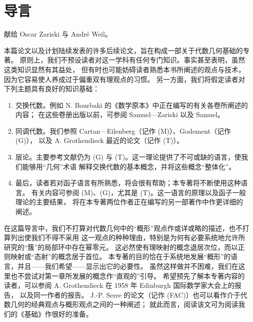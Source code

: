 \chapter*{导言}
\begin{flushright}
献给 Oscar Zariski 与 André Weil。
\end{flushright}

本篇论文以及计划陆续发表的许多后续论文，旨在构成一部关于代数几何基础的专著。
原则上，我们不预设读者对这一学科有任何专门知识。事实甚至表明，虽然这类知识显然有其益处，
但有时也可能妨碍读者熟悉本书所阐述的观点与技术，因为它容易使人养成过于偏重双有理观点的习惯。
另一方面，我们将假定读者对下列主题具有良好的知识基础：
\begin{enumerate}[label=\alph*)]
\item 交换代数。例如 N. Bourbaki 的《数学原本》中正在编写的有关各卷所阐述的内容；
在这些卷册出版以前，可参阅 Samuel—Zariski\cite{b13} 以及 Samuel\cite{b11,b12}。
\item 同调代数。我们参照 Cartan—Eilenberg\cite{b2}（记作 (M)）、Godement\cite{b4}（记作 (G)），
以及 A. Grothendieck 最近的论文\cite{b6}（记作 (T)）。
\item 层论。主要参考文献仍为 (G) 与 (T)。这一理论提供了不可或缺的语言，使我们能够用“几何”术语
解释交换代数的基本概念，并将这些概念“整体化”。
\item 最后，读者若对函子语言有所熟悉，将会很有帮助；本专著将不断使用这种语言。
有关内容可参阅 (M)、(G)，尤其是 (T)。这一语言的原理以及函子一般理论的主要结果，
将在本专著两位作者正在编写的另一部著作中作更详细的阐述。
\end{enumerate}

\separation

在这篇导言中，我们不打算对代数几何中的“概形”观点作或详或略的描述，也不打算列出使我们不得不采用
这一观点的种种理由，特别是为何有必要系统地允许所研究的“簇”的局部环中存在幂零元。
这必然使有理映射的概念退居次位，而以正则映射或“态射”的概念居于首位。
本专著的目的恰在于系统地发展“概形”的语言，并且——我们希望——显示出它的必要性。
虽然这样做并不困难，我们在这里也不尝试对第一章所发展的概念作“直观的”引导。
希望预先了解本专著内容的读者，可以参阅 A. Grothendieck 在 1958 年 Edinburgh 国际数学家大会上的报告\cite{b7}，
以及同一作者的报告\cite{b8}。
J.-P. Serre 的论文\cite{b14}（记作 (FAC)）也可以看作介于代数几何的经典观点与概形观点之间的一种阐述；
就此而言，阅读该文可为阅读我们的《基础》作很好的准备。

\separation

